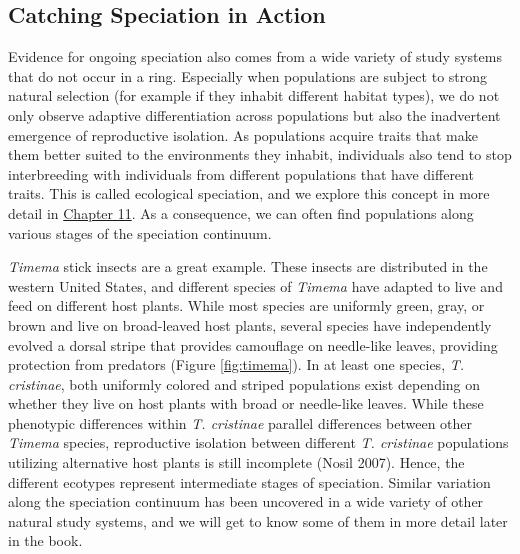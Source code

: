 \documentclass[
]{book}
\begin{document}
\hypertarget{catching-speciation-in-action}{%
\subsection{Catching Speciation in Action}\label{catching-speciation-in-action}}

Evidence for ongoing speciation also comes from a wide variety of study systems that do not occur in a ring. Especially when populations are subject to strong natural selection (for example if they inhabit different habitat types), we do not only observe adaptive differentiation across populations but also the inadvertent emergence of reproductive isolation. As populations acquire traits that make them better suited to the environments they inhabit, individuals also tend to stop interbreeding with individuals from different populations that have different traits. This is called ecological speciation, and we explore this concept in more detail in \href{speciation-1.html}{Chapter 11}. As a consequence, we can often find populations along various stages of the speciation continuum.

\emph{Timema} stick insects are a great example. These insects are distributed in the western United States, and different species of \emph{Timema} have adapted to live and feed on different host plants. While most species are uniformly green, gray, or brown and live on broad-leaved host plants, several species have independently evolved a dorsal stripe that provides camouflage on needle-like leaves, providing protection from predators (Figure \ref{fig:timema}). In at least one species, \emph{T. cristinae}, both uniformly colored and striped populations exist depending on whether they live on host plants with broad or needle-like leaves. While these phenotypic differences within \emph{T. cristinae} parallel differences between other \emph{Timema} species, reproductive isolation between different \emph{T. cristinae} populations utilizing alternative host plants is still incomplete (Nosil 2007). Hence, the different ecotypes represent intermediate stages of speciation. Similar variation along the speciation continuum has been uncovered in a wide variety of other natural study systems, and we will get to know some of them in more detail later in the book.
\end{document}
